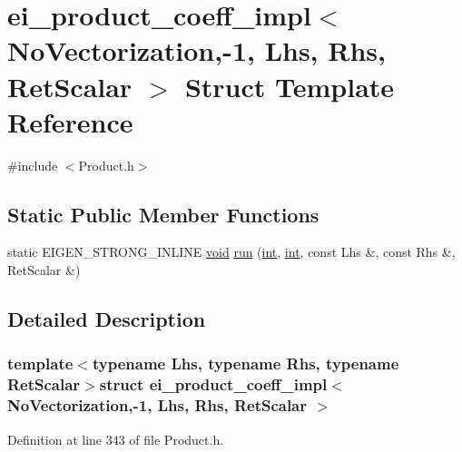 \hypertarget{structei__product__coeff__impl_3_01_no_vectorization_00-1_00_01_lhs_00_01_rhs_00_01_ret_scalar_01_4}{\section{ei\-\_\-product\-\_\-coeff\-\_\-impl$<$ No\-Vectorization,-\/1, Lhs, Rhs, Ret\-Scalar $>$ Struct Template Reference}
\label{structei__product__coeff__impl_3_01_no_vectorization_00-1_00_01_lhs_00_01_rhs_00_01_ret_scalar_01_4}
}


{\ttfamily \#include $<$Product.\-h$>$}

\subsection*{Static Public Member Functions}
\begin{DoxyCompactItemize}
\item 
static E\-I\-G\-E\-N\-\_\-\-S\-T\-R\-O\-N\-G\-\_\-\-I\-N\-L\-I\-N\-E \hyperlink{group___u_a_v_objects_plugin_ga444cf2ff3f0ecbe028adce838d373f5c}{void} \hyperlink{structei__product__coeff__impl_3_01_no_vectorization_00-1_00_01_lhs_00_01_rhs_00_01_ret_scalar_01_4_a29f5922d18fd2d78249ec025b5db3917}{run} (\hyperlink{ioapi_8h_a787fa3cf048117ba7123753c1e74fcd6}{int}, \hyperlink{ioapi_8h_a787fa3cf048117ba7123753c1e74fcd6}{int}, const Lhs \&, const Rhs \&, Ret\-Scalar \&)
\end{DoxyCompactItemize}


\subsection{Detailed Description}
\subsubsection*{template$<$typename Lhs, typename Rhs, typename Ret\-Scalar$>$struct ei\-\_\-product\-\_\-coeff\-\_\-impl$<$ No\-Vectorization,-\/1, Lhs, Rhs, Ret\-Scalar $>$}



Definition at line 343 of file Product.\-h.



